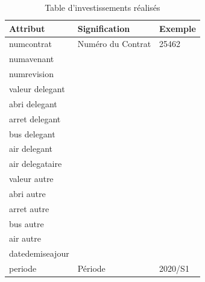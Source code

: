 \documentclass[a4paper]{report}
\begin{document}
\begin{doublespace}
	\begin{table}[H]
		\begin{center}
			\begin{tabularx}{17.5cm}{|X|p{3cm}|p{1.5cm}|}
				\hline
				\textbf{Attribut} & \textbf{Signification} & \textbf{Exemple} \\
				\hline
				numcontrat       & Numéro du Contrat      & 25462            \\
				\hline
				numavenant       &                        &                  \\
				\hline
				numrevision      &                        &                  \\
				\hline
				valeur delegant   &                        &                  \\
				\hline
				abri delegant     &                        &                  \\
				\hline
				arret delegant    &                        &                  \\
				\hline
				bus delegant      &                        &                  \\
				\hline
				air delegant      &                        &                  \\
				\hline
				air delegataire   &                        &                  \\
				\hline
				valeur autre      &                        &                  \\
				\hline
				abri autre        &                        &                  \\
				\hline
				arret autre       &                        &                  \\
				\hline
				bus autre         &                        &                  \\
				\hline
				air autre         &                        &                  \\
				\hline
				datedemiseajour   &                        &                  \\
				\hline
				periode           & Période                & 2020/S1          \\
				\hline
			\end{tabularx}
			\caption{Table d'investissements réalisés}
		\end{center}
	\end{table}


\end{doublespace}
\end{document}
